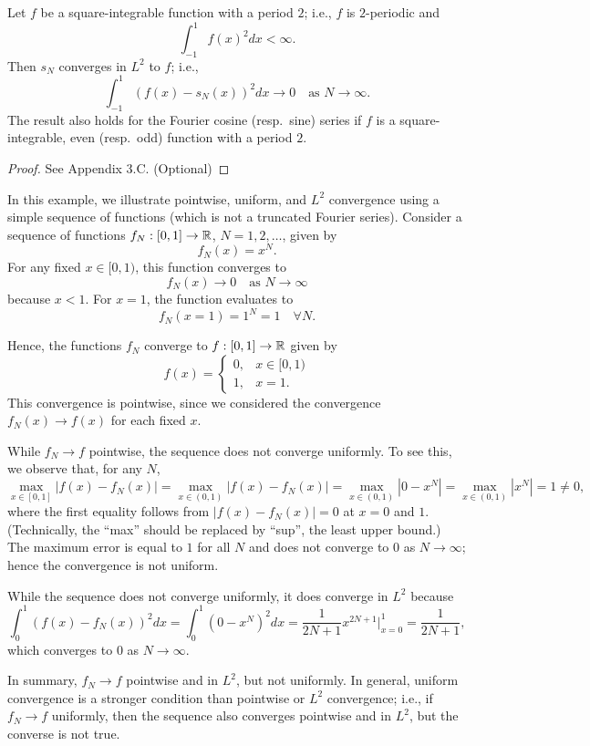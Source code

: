 \begin{theorem}
    Let $f$ be a square-integrable function with a period $2$; i.e., $f$ is $2$-periodic and
    \[\int_{-1}^{1} f(x)^2 dx < \infty.\]
    Then $s_N$ converges in $L^2$ to $f$; i.e.,
    \[\int_{-1}^{1} (f(x) - s_N(x))^2 dx \to 0 \quad \text{as } N \to \infty.\]
    The result also holds for the Fourier cosine (resp.\ sine) series if $f$ is a square-integrable, even (resp.\ odd) function with a period $2$.
\end{theorem}
\begin{proof}
    See Appendix 3.C. (Optional)
\end{proof}

\begin{example}
    In this example, we illustrate pointwise, uniform, and $L^2$ convergence using a simple sequence of functions (which is not a truncated Fourier series). Consider a sequence of functions $f_N : [0, 1] \to \mathbb{R}$, $N = 1, 2, \dots$, given by
    \[f_N(x) = x^N.\]
    For any fixed $x \in [0, 1)$, this function converges to
    \[f_N(x) \to 0 \quad \text{as } N \to \infty\]
    because $x < 1$. For $x = 1$, the function evaluates to
    \[f_N(x = 1) = 1^N = 1 \quad \forall N.\]


    Hence, the functions $f_N$ converge to $f : [0, 1] \to \mathbb{R}$ given by
    \[f(x) = \begin{cases} 0, & x \in [0, 1) \\ 1, & x = 1. \end{cases}\]
    This convergence is pointwise, since we considered the convergence $f_N(x) \to f(x)$ for each fixed $x$.

    While $f_N \to f$ pointwise, the sequence does not converge uniformly. To see this, we observe that, for any $N$,
    \[\max_{x \in [0,1]} |f(x) - f_N(x)| = \max_{x \in (0,1)} |f(x) - f_N(x)| = \max_{x \in (0,1)} |0 - x^N| = \max_{x \in (0,1)} |x^N| = 1 \neq 0,\]
    where the first equality follows from $|f(x) - f_N(x)| = 0$ at $x = 0$ and $1$. (Technically, the ``max'' should be replaced by ``sup'', the least upper bound.) The maximum error is equal to $1$ for all $N$ and does not converge to $0$ as $N \to \infty$; hence the convergence is not uniform.

    While the sequence does not converge uniformly, it does converge in $L^2$ because
    \[\int_0^1 (f(x) - f_N(x))^2 dx = \int_0^1 (0 - x^N)^2 dx = \frac{1}{2N + 1} x^{2N+1} \Big|_{x=0}^{1} = \frac{1}{2N + 1},\]
    which converges to $0$ as $N \to \infty$.

    In summary, $f_N \to f$ pointwise and in $L^2$, but not uniformly. In general, uniform convergence is a stronger condition than pointwise or $L^2$ convergence; i.e., if $f_N \to f$ uniformly, then the sequence also converges pointwise and in $L^2$, but the converse is not true.
\end{example}

